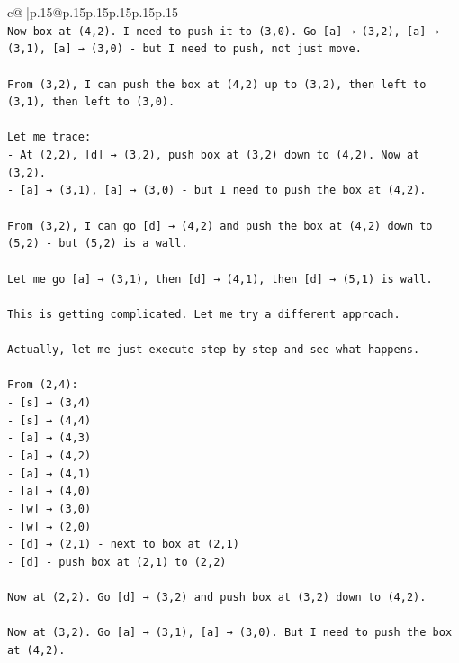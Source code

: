 \documentclass{article}
\begin{document}
{\begin{supertabular}{c@{$\;$}|p{.15\linewidth}@{}p{.15\linewidth}p{.15\linewidth}p{.15\linewidth}p{.15\linewidth}p{.15\linewidth}}
{{{\\ 
\texttt{Now box at (4,2). I need to push it to (3,0). Go {[}a{]} → (3,2), {[}a{]} → (3,1), {[}a{]} → (3,0) {-} but I need to push, not just move.} \\
\\ 
\texttt{From (3,2), I can push the box at (4,2) up to (3,2), then left to (3,1), then left to (3,0).} \\
\\ 
\texttt{Let me trace:} \\
\texttt{{-} At (2,2), {[}d{]} → (3,2), push box at (3,2) down to (4,2). Now at (3,2).} \\
\texttt{{-} {[}a{]} → (3,1), {[}a{]} → (3,0) {-} but I need to push the box at (4,2).} \\
\\ 
\texttt{From (3,2), I can go {[}d{]} → (4,2) and push the box at (4,2) down to (5,2) {-} but (5,2) is a wall.} \\
\\ 
\texttt{Let me go {[}a{]} → (3,1), then {[}d{]} → (4,1), then {[}d{]} → (5,1) is wall.} \\
\\ 
\texttt{This is getting complicated. Let me try a different approach.} \\
\\ 
\texttt{Actually, let me just execute step by step and see what happens.} \\
\\ 
\texttt{From (2,4):} \\
\texttt{{-} {[}s{]} → (3,4)} \\
\texttt{{-} {[}s{]} → (4,4)} \\
\texttt{{-} {[}a{]} → (4,3)} \\
\texttt{{-} {[}a{]} → (4,2)} \\
\texttt{{-} {[}a{]} → (4,1)} \\
\texttt{{-} {[}a{]} → (4,0)} \\
\texttt{{-} {[}w{]} → (3,0)} \\
\texttt{{-} {[}w{]} → (2,0)} \\
\texttt{{-} {[}d{]} → (2,1) {-} next to box at (2,1)} \\
\texttt{{-} {[}d{]} {-} push box at (2,1) to (2,2)} \\
\\ 
\texttt{Now at (2,2). Go {[}d{]} → (3,2) and push box at (3,2) down to (4,2).} \\
\\ 
\texttt{Now at (3,2). Go {[}a{]} → (3,1), {[}a{]} → (3,0). But I need to push the box at (4,2).} \\
}}}
\end{supertabular}}
\end{document}
